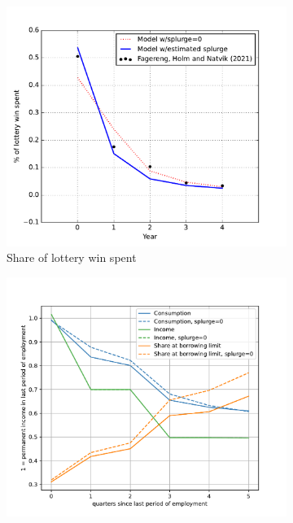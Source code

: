 \begin{figure}[thb]
	\centering
	\begin{subfigure}[b]{.48\linewidth}
		\centering
		\includegraphics[width=\linewidth]{text/Chapter3/Figures/iMPCs_both}
		\caption{Share of lottery win spent}
		\label{fig:USaggmpclotterywin_wSplZero}
	\end{subfigure}
	\begin{subfigure}[b]{.48\linewidth}
		\centering
		\includegraphics[width=\linewidth]{text/Chapter3/Code/HA-Models/FromPandemicCode/Figures/Splurge0/UIextension_CompSplurge0}

\end{subfigure}
\end{figure}
